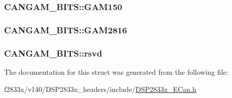 \subsubsection[{G\+A\+M150}]{ C\+A\+N\+G\+A\+M\+\_\+\+B\+I\+T\+S\+::\+G\+A\+M150}\label{struct_c_a_n_g_a_m___b_i_t_s_aa00a0d2413e29f6d399fcca7c89aaf15}
\hypertarget{struct_c_a_n_g_a_m___b_i_t_s_aaa0ef4eff24a2912c463cee73f9bfbc5}{}
\subsubsection[{G\+A\+M2816}]{ C\+A\+N\+G\+A\+M\+\_\+\+B\+I\+T\+S\+::\+G\+A\+M2816}\label{struct_c_a_n_g_a_m___b_i_t_s_aaa0ef4eff24a2912c463cee73f9bfbc5}
\hypertarget{struct_c_a_n_g_a_m___b_i_t_s_af2c1001cb07c240e4164ba773d163252}{}
\subsubsection[{rsvd}]{ C\+A\+N\+G\+A\+M\+\_\+\+B\+I\+T\+S\+::rsvd}\label{struct_c_a_n_g_a_m___b_i_t_s_af2c1001cb07c240e4164ba773d163252}


The documentation for this struct was generated from the following file\+:\begin{DoxyCompactItemize}
\item 
f2833x/v140/\+D\+S\+P2833x\+\_\+headers/include/\hyperlink{_d_s_p2833x___e_can_8h}{D\+S\+P2833x\+\_\+\+E\+Can.\+h}\end{DoxyCompactItemize}
